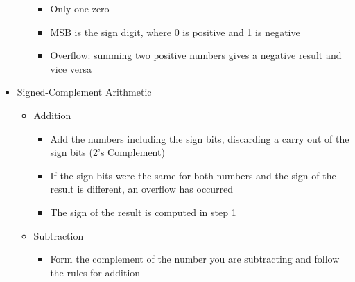 \begin{itemize}
\begin{itemize}
\begin{itemize}
\begin{itemize}
            \end{itemize}

          \item Only one zero

          \item MSB is the sign digit, where 0 is positive and 1 is negative

          \item Overflow: summing two positive numbers gives a negative result and vice versa

        \end{itemize}

    \end{itemize}

  \item Signed-Complement Arithmetic

    \begin{itemize}

      \item Addition

        \begin{itemize}

          \item Add the numbers including the sign bits, discarding a carry out of the sign bits (2's Complement)

          \item If the sign bits were the same for both numbers and the sign of the result is different, an overflow has occurred

          \item The sign of the result is computed in step 1

        \end{itemize}

      \item Subtraction

        \begin{itemize}

          \item Form the complement of the number you are subtracting and follow the rules for addition
            
        \end{itemize}

    \end{itemize}

\end{itemize}



